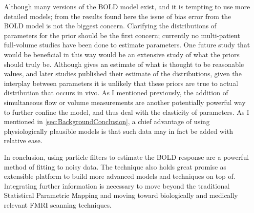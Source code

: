 Although many versions of the BOLD model exist, and it is tempting to use 
more detailed models; from the results found here the issue of bias error
from the BOLD model is not the biggest concern. Clarifying the distributions
of parameters for the prior should be the first concern; currently no multi-patient
full-volume studies have been done to estimate parameters.
One future study that would be beneficial in this way  would
be an extensive study of what the priors should truly be. Although \cite{Friston2000}
gives an estimate of what is thought to be reasonable values, and later studies
published their estimate of the distributions, given the interplay between
parameters it is unlikely that these priors are true to actual distribution
that occurs in vivo. As I mentioned previously, the addition of simultaneous
flow or volume measurements are another potentially powerful way to further confine the model,
and thus deal with the elasticity of parameters. As I mentioned in 
\autoref{sec:BackgroundConclusion}, a chief advantage of using physiologically
plausible models is that such data may in fact be added with relative ease.

In conclusion, using particle filters to estimate the BOLD response are 
a powerful method of fitting to noisy data. The technique also
holds great promise as extensible platform to build more advanced models
and techniques on top of. Integrating further information is necessary to
move beyond the traditional Statistical Parametric Mapping and moving
toward biologically and medically relevant FMRI scanning techniques. 
